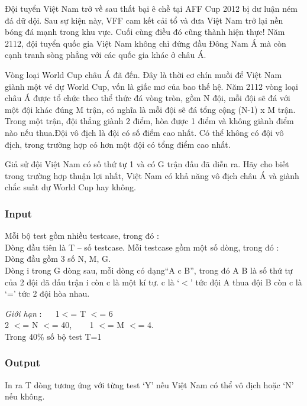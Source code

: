 



\textbf{}   Đội tuyển Việt Nam trở về sau thất bại ê chề tại AFF Cup 2012 bị dư luận ném đá dữ dội. Sau sự kiện này, VFF cam kết cải tổ và đưa Việt Nam trở lại nền bóng đá mạnh trong khu vực. Cuối cùng điều đó cũng thành hiện thực! Năm 2112, đội tuyển quốc gia Việt Nam không chỉ đứng đầu Đông Nam Á mà còn cạnh tranh sòng phẳng với các quốc gia khác ở châu Á.  

   Vòng loại World Cup châu Á đã đến. Đây là thời cơ chín muồi để Việt Nam giành một vé dự World Cup, vốn là giấc mơ của bao thế hệ. Năm 2112 vòng loại châu Á được tổ chức theo thể thức đá vòng tròn, gồm N đội, mỗi đội sẽ đá với một đội khác đúng M trận, có nghĩa là mỗi đội sẽ đá tổng cộng (N-1) x M trận. Trong một trận, đội thắng giành 2 điểm, hòa được 1 điểm và không giành điểm nào nếu thua.Đội vô địch là đội có số điểm cao nhất. Có thể không có đội vô địch, trong trường hợp có hơn một đội có tổng điểm cao nhất.  

   Giả sử đội Việt Nam có số thứ tự 1 và có G trận đấu đã diễn ra. Hãy cho biết trong trường hợp thuận lợi nhất, Việt Nam có khả năng vô địch châu Á và giành chắc suất dự World Cup hay không.  

\subsubsection{   Input  }

   Mỗi bộ test gồm nhiều testcase, trong đó :   \textbf{
\\}   Dòng đầu tiên là T – số testcase. Mỗi testcase gồm một số dòng, trong đó :   
\\   Dòng đầu gồm 3 số N, M, G.   
\\   Dòng i trong G dòng sau, mỗi dòng có dạng“A c B”, trong đó A B là số thứ tự của 2 đội đã đấu trận i còn c là một kí tự. c là ‘$<$’ tức đội A thua đội B còn c là ‘=’ tức 2 đội hòa nhau.  

\emph{    Giới hạn   }   :    1$<$= T $<$= 6   
\\   2 $<$= N $<$= 40,     1 $<$= M $<$= 4.   
\\   Trong 40\% số bộ test T=1  

\subsubsection{   Output  }

   In ra T dòng tương ứng với từng test ‘Y’ nếu Việt Nam có thể vô địch hoặc ‘N’ nếu không.  

